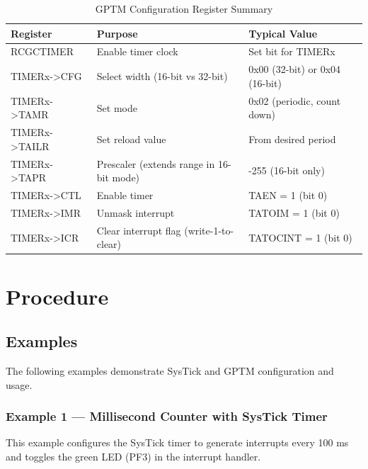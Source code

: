 \begin{table}[H]
\centering
\small
\setlength{\tabcolsep}{6pt}
\renewcommand{\arraystretch}{1.15}
\begin{tabularx}{0.98\linewidth}{>{\ttfamily}l X >{\ttfamily}l}
\toprule
\textnormal{\textbf{Register}} & \textnormal{\textbf{Purpose}} & \textnormal{\textbf{Typical Value}} \\
\midrule
RCGCTIMER      & Enable timer clock                                       & Set bit for TIMERx \\
TIMERx->CFG    & Select width (16-bit vs 32-bit)                           & 0x00 (32-bit) or 0x04 (16-bit) \\
TIMERx->TAMR   & Set mode                                                  & 0x02 (periodic, count down) \\
TIMERx->TAILR  & Set reload value                                          & From desired period \\
TIMERx->TAPR   & Prescaler (extends range in 16-bit mode)                  & 0-255 (16-bit only) \\
TIMERx->CTL    & Enable timer                                              & TAEN = 1 (bit 0) \\
TIMERx->IMR    & Unmask interrupt                                          & TATOIM = 1 (bit 0) \\
TIMERx->ICR    & Clear interrupt flag (write-1-to-clear)                   & TATOCINT = 1 (bit 0) \\
\bottomrule
\end{tabularx}
\caption{GPTM Configuration Register Summary}
\end{table}


\newpage
\section{Procedure}

\subsection{Examples}

The following examples demonstrate SysTick and GPTM configuration and usage.

\subsubsection{Example 1 — Millisecond Counter with SysTick Timer}

This example configures the SysTick timer to generate interrupts every 100 ms and toggles the green LED (PF3) in the interrupt handler.

